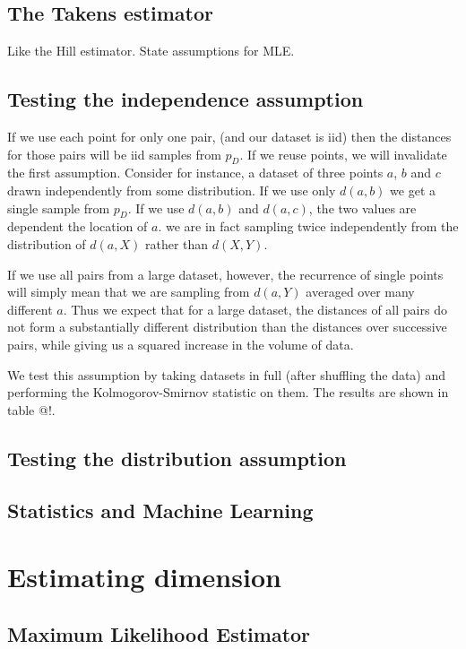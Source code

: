 \documentclass[10pt]{article}
\begin{document}
\subsection{The Takens estimator}

Like the Hill estimator. State assumptions for MLE. 

\subsection{Testing the independence assumption}

If we use each point for only one pair, (and our dataset is iid) then the distances for those pairs will be iid samples from $p_D$. If we reuse points, we will invalidate the first assumption. Consider for instance, a dataset of three points $a$, $b$ and $c$ drawn independently from some distribution. If we use only $d(a, b)$ we get a single sample from $p_D$. If we use $d(a, b)$ and $d(a, c)$, the two values are dependent the location of $a$. we are in fact sampling twice independently from the distribution of $d(a, X)$ rather than $d(X, Y)$.
 
If we use all pairs from a large dataset, however, the recurrence of single points will simply mean that we are sampling from $d(a, Y)$ averaged over many different $a$. Thus we expect that for a large dataset, the distances of all pairs do not form a substantially different distribution than the distances over successive pairs, while giving us a squared increase in the volume of data.

We test this assumption by taking datasets in full (after shuffling the data) and performing the Kolmogorov-Smirnov statistic on them. The results are shown in table @!.

\subsection{Testing the distribution assumption}



\subsection{Statistics and Machine Learning}

\section{Estimating dimension}

\subsection{Maximum Likelihood Estimator}
\end{document}
